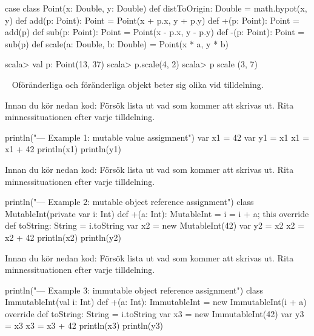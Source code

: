 \SubtaskSolved 
\begin{Code}
case class Point(x: Double, y: Double) {
  def distToOrigin: Double = math.hypot(x, y)
  def add(p: Point): Point = Point(x + p.x, y + p.y)
  def +(p: Point): Point = add(p)
  def sub(p: Point): Point = Point(x - p.x, y - p.y)
  def -(p: Point): Point = sub(p)
  def scale(a: Double, b: Double) = Point(x * a, y * b)
}
\end{Code}
\begin{REPL}
scala> val p: Point(13,  37)
scala> p.scale(4, 2)
scala> p scale (3, 7)
\end{REPL}


\QUESTEND









\QUESTBEGIN

\Task  \what~  Oföränderliga och föränderliga objekt beter sig olika vid tilldelning.

\Subtask\Pen Innan du kör nedan kod: Försök lista ut vad som kommer att skrivas ut. Rita minnessituationen efter varje tilldelning.

\begin{Code}
println("\n--- Example 1: mutable value assigmnent")
var x1 = 42
var y1 = x1
x1 = x1 + 42
println(x1)
println(y1)
\end{Code}

\Subtask\Pen Innan du kör nedan kod: Försök lista ut vad som kommer att skrivas ut. Rita minnessituationen efter varje tilldelning.

\begin{Code}
println("\n--- Example 2: mutable object reference assignment")
class MutableInt(private var i: Int) {
  def +(a: Int): MutableInt = { i = i + a; this }
  override def toString: String = i.toString
}
var x2 = new MutableInt(42)
var y2 = x2
x2 = x2 + 42
println(x2)
println(y2)
\end{Code}

\Subtask\Pen Innan du kör nedan kod: Försök lista ut vad som kommer att skrivas ut. Rita minnessituationen efter varje tilldelning.

\begin{Code}
println("\n--- Example 3: immutable object reference assignment")
class ImmutableInt(val i: Int) {
  def +(a: Int): ImmutableInt = new ImmutableInt(i + a)
  override def toString: String = i.toString
}
var x3 = new ImmutableInt(42)
var y3 = x3
x3 = x3 + 42
println(x3)
println(y3)
\end{Code}

